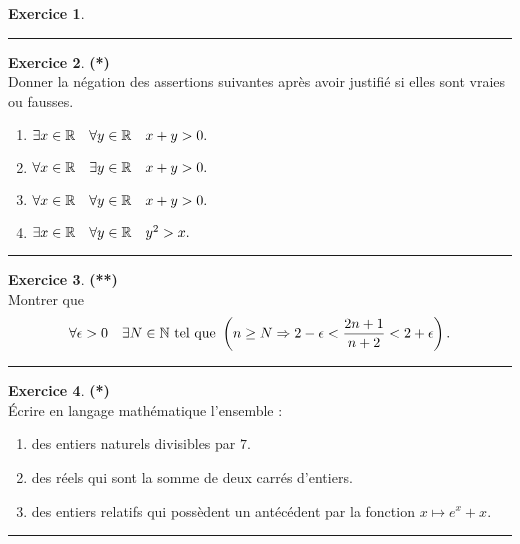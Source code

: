 \documentclass[a4paper,11pt]{article}
\theoremstyle{definition}
\newtheorem{exo}{Exercice} %
\begin{document}
\begin{minipage}{1\linewidth}
\begin{minipage}[t]{0.48\linewidth}
\begin{exo}
	\centering
	\rule{1\linewidth}{0.6pt}
\end{exo}

\begin{exo}\textbf{(*)}\quad\\[0.2cm]
Donner la négation des assertions suivantes après avoir justifié si elles sont vraies ou fausses.  
\begin{enumerate}
	\item $\exists x\in \mathbb{R} \quad \forall y\in \mathbb{R} \quad x+y > 0. $
	\item $\forall x\in \mathbb{R} \quad \exists y\in \mathbb{R} \quad x+y > 0. $ 
	\item $ \forall x\in \mathbb{R} \quad \forall y\in \mathbb{R} \quad x+y > 0. $
	\item $ \exists x\in \mathbb{R}\quad \forall y\in \mathbb{R} \quad y^2 > x .$
\end{enumerate}


\centering
\rule{1\linewidth}{0.6pt}
\end{exo}



\end{minipage}	
\hfill\vrule\hfill
\begin{minipage}[t]{0.48\linewidth}
\raggedright



\begin{exo}\textbf{(**)}\quad\\[0.2cm]
	
	Montrer que 
	$$\forall \epsilon >0 \quad \exists N \in \mathbb{N} \text{ tel que }
	\left(n \geq N \Rightarrow 2-\epsilon < \frac{2n + 1}{n + 2} < 2 + \epsilon\right).$$
	
	\centering
	\rule{1\linewidth}{0.6pt}
\end{exo}


\begin{exo}\textbf{(*)}\quad\\[0.2cm]
	Écrire en langage mathématique l'ensemble :
	\begin{enumerate}
		\item des entiers naturels divisibles par $7$.
		\item des réels qui sont la somme de deux carrés d'entiers.
		\item des entiers relatifs qui possèdent un antécédent
		par la fonction $x\longmapsto e^x + x$.
	\end{enumerate}
	\centering
	\rule{1\linewidth}{0.6pt}
\end{exo}

\end{minipage}
\end{minipage}
\end{document}
